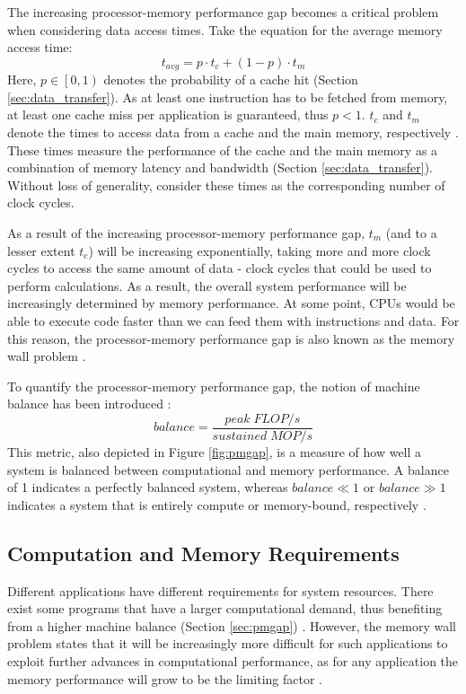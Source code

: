 The increasing processor-memory performance gap becomes a critical problem when considering data access times. Take the equation for the average memory access time:
\begin{equation}\label{eq:avg_mem_time}
t_{avg} = p \cdot t_c + (1-p) \cdot t_m
\end{equation}
Here, $p \in \left[0,1\right)$ denotes the probability of a cache hit (Section \ref{sec:data_transfer}). As at least one instruction has to be fetched from memory, at least one cache miss per application is guaranteed, thus $p < 1$. $t_c$ and $t_m$ denote the times to access data from a cache and the main memory, respectively \cite{wulf1995hitting, mahapatra1999processor}. These times measure the performance of the cache and the main memory as a combination of memory latency and bandwidth (Section \ref{sec:data_transfer}). Without loss of generality, consider these times as the corresponding number of clock cycles.

As a result of the increasing processor-memory performance gap, $t_m$ (and to a lesser extent $t_c$) will be increasing exponentially, taking more and more clock cycles to access the same amount of data - clock cycles that could be used to perform calculations. As a result, the overall system performance will be increasingly determined by memory performance. At some point, CPUs would be able to execute code faster than we can feed them with instructions and data. For this reason, the processor-memory performance gap is also known as the memory wall problem \cite{wulf1995hitting, mckee2004reflections, mahapatra1999processor}.

To quantify the processor-memory performance gap, the notion of machine balance has been introduced \cite{mccalpin1997survey, mccalpin2016memory}:
\begin{equation}\label{eq:machine_balance}
	balance = \frac{peak\; FLOP/s}{sustained\; MOP/s}
\end{equation}
This metric, also depicted in Figure \ref{fig:pmgap}, is a measure of how well a system is balanced between computational and memory performance. A balance of 1 indicates a perfectly balanced system, whereas $balance \ll 1$ or $balance \gg 1$  indicates a system that is entirely compute or memory-bound, respectively \cite{mccalpin1997survey, mccalpin2016memory}.

\subsection{Computation and Memory Requirements}\label{sec:comp_mem_req}
Different applications have different requirements for system resources. There exist some programs that have a larger computational demand, thus benefiting from a higher machine balance (Section \ref{sec:pmgap}) \cite{mccalpin2016memory}. However, the memory wall problem states that it will be increasingly more difficult for such applications to exploit further advances in computational performance, as for any application the memory performance will grow to be the limiting factor \cite{wulf1995hitting, mckee2004reflections}.


